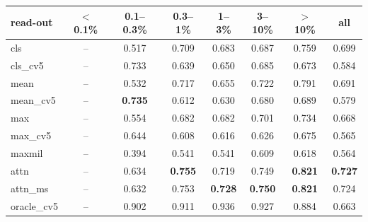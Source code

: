 \begin{tabular}{lccccccc}
\toprule
read-out & $<$0.1\% & 0.1--0.3\% & 0.3--1\% & 1--3\% & 3--10\% & $>$10\% & all \\
\midrule
cls & -- & 0.517 & 0.709 & 0.683 & 0.687 & 0.759 & 0.699 \\
cls\_cv5 & -- & 0.733 & 0.639 & 0.650 & 0.685 & 0.673 & 0.584 \\
mean & -- & 0.532 & 0.717 & 0.655 & 0.722 & 0.791 & 0.691 \\
mean\_cv5 & -- & \textbf{0.735} & 0.612 & 0.630 & 0.680 & 0.689 & 0.579 \\
max & -- & 0.554 & 0.682 & 0.682 & 0.701 & 0.734 & 0.668 \\
max\_cv5 & -- & 0.644 & 0.608 & 0.616 & 0.626 & 0.675 & 0.565 \\
maxmil & -- & 0.394 & 0.541 & 0.541 & 0.609 & 0.618 & 0.564 \\
attn & -- & 0.634 & \textbf{0.755} & 0.719 & 0.749 & \textbf{0.821} & \textbf{0.727} \\
attn\_ms & -- & 0.632 & 0.753 & \textbf{0.728} & \textbf{0.750} & \textbf{0.821} & 0.724 \\
\midrule
oracle\_cv5 & -- & 0.902 & 0.911 & 0.936 & 0.927 & 0.884 & 0.663 \\
\bottomrule
\end{tabular}
